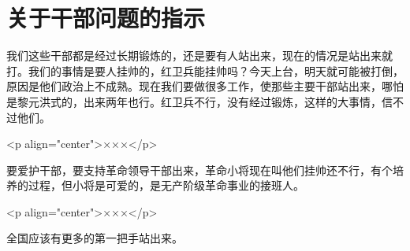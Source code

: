 \section[关于干部问题的指示（一九六七年六月）]{关于干部问题的指示}


我们这些干部都是经过长期锻炼的，还是要有人站出来，现在的情况是站出来就打。我们的事情是要人挂帅的，红卫兵能挂帅吗？今天上台，明天就可能被打倒，原因是他们政治上不成熟。现在我们要做很多工作，使那些主要干部站出来，哪怕是黎元洪式的，出来两年也行。红卫兵不行，没有经过锻炼，这样的大事情，信不过他们。

<p align="center">×××</p>

要爱护干部，要支持革命领导干部出来，革命小将现在叫他们挂帅还不行，有个培养的过程，但小将是可爱的，是无产阶级革命事业的接班人。

<p align="center">×××</p>

全国应该有更多的第一把手站出来。


